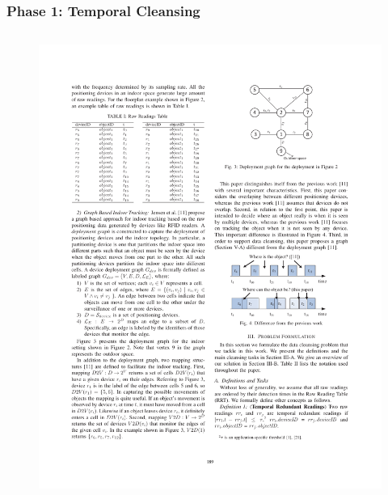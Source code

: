 \begin{frame}
\frametitle{Phase 1: Temporal Cleansing}

\begin{columns}[c]

  \begin{figure}[tb]
    \includegraphics[width=\columnwidth]{figures/3-2/3-2-2.pdf}
  \end{figure}


\end{columns}
\end{frame}
